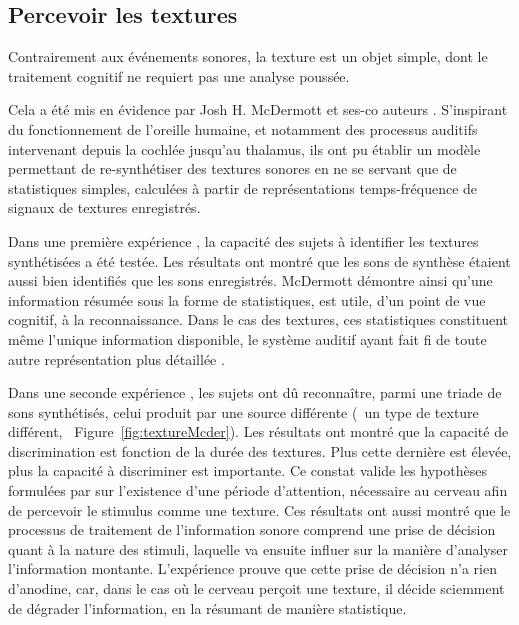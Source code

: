 \subsection{Percevoir les textures}
\label{sec:ch3_texturePerception}

Contrairement aux événements sonores, la texture est un objet simple, dont le traitement cognitif ne requiert pas une analyse poussée. 

Cela a été mis en évidence par Josh H. McDermott et ses-co auteurs \citep{mcdermott2011sound,mcdermott2013summary}. S'inspirant du fonctionnement de l'oreille humaine, et notamment des processus auditifs intervenant depuis la cochlée jusqu'au thalamus, ils ont pu établir un modèle permettant de re-synthétiser des textures sonores en ne se servant que de statistiques simples, calculées à partir de représentations temps-fréquence de signaux de textures enregistrés. 

Dans une première expérience \citep{mcdermott2011sound}, la capacité des sujets à identifier les textures synthétisées a été testée. Les résultats ont montré que les sons de synthèse étaient aussi bien identifiés que les sons enregistrés. McDermott démontre ainsi qu'une information résumée sous la forme de statistiques, est utile, d'un point de vue cognitif, à la reconnaissance. Dans le cas des textures, ces statistiques constituent même l'unique information disponible, le système auditif ayant fait fi de toute autre représentation plus détaillée \citep{nelken2013ear}.

Dans une seconde expérience \citep{mcdermott2013summary}, les sujets ont dû reconnaître, parmi une triade de sons synthétisés, celui produit par une source différente (\ie~un type de texture différent, \cf~Figure~\ref{fig:textureMcder}). Les résultats ont montré que la capacité de discrimination est fonction de la durée des textures. Plus cette dernière est élevée, plus la capacité à discriminer est importante. Ce constat valide les hypothèses formulées par \citep{saint1995classification} sur l'existence d'une période d'attention, nécessaire au cerveau afin de percevoir le stimulus comme une texture. Ces résultats ont aussi montré que le processus de traitement de l'information sonore comprend une prise de décision quant à la nature des stimuli, laquelle va ensuite influer sur la manière d'analyser l'information montante. L'expérience prouve que cette prise de décision n'a rien d'anodine, car, dans le cas où le cerveau perçoit une texture, il décide sciemment de dégrader l'information, en la résumant de manière statistique.

